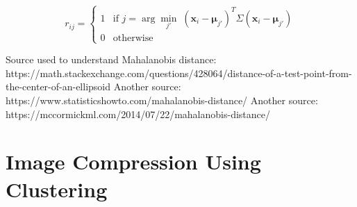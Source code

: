 \documentclass[twoside,10pt]{article}
\begin{document}
\begin{enumerate}
\[
r_{ij} = \begin{cases}
1 & \text{if } j = \arg \min_{j'} \; (\mathbf{x}_i - \boldsymbol{\mu}_{j'})^T \Sigma (\mathbf{x}_i - \boldsymbol{\mu}_{j'}) \\
0 & \text{otherwise}
\end{cases}
\]


Source used to understand Mahalanobis distance: https://math.stackexchange.com/questions/428064/distance-of-a-test-point-from-the-center-of-an-ellipsoid
Another source: https://www.statisticshowto.com/mahalanobis-distance/
Another source: https://mccormickml.com/2014/07/22/mahalanobis-distance/
\end{enumerate}

\section{Image Compression Using Clustering}
\end{document}
